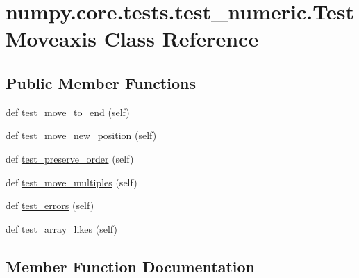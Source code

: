 \hypertarget{classnumpy_1_1core_1_1tests_1_1test__numeric_1_1TestMoveaxis}{}\section{numpy.\+core.\+tests.\+test\+\_\+numeric.\+Test\+Moveaxis Class Reference}
\label{classnumpy_1_1core_1_1tests_1_1test__numeric_1_1TestMoveaxis}
\subsection*{Public Member Functions}
\begin{DoxyCompactItemize}
\item 
def \hyperlink{classnumpy_1_1core_1_1tests_1_1test__numeric_1_1TestMoveaxis_a526c333196baffa4efd9539b0d2e0b01}{test\+\_\+move\+\_\+to\+\_\+end} (self)
\item 
def \hyperlink{classnumpy_1_1core_1_1tests_1_1test__numeric_1_1TestMoveaxis_aeb56fa047a7b46254975a127d343b294}{test\+\_\+move\+\_\+new\+\_\+position} (self)
\item 
def \hyperlink{classnumpy_1_1core_1_1tests_1_1test__numeric_1_1TestMoveaxis_ada320ecc6b9b4a7f24f2d431146dc5da}{test\+\_\+preserve\+\_\+order} (self)
\item 
def \hyperlink{classnumpy_1_1core_1_1tests_1_1test__numeric_1_1TestMoveaxis_a112dd2244fec9d72d9441cbd34c8b4d5}{test\+\_\+move\+\_\+multiples} (self)
\item 
def \hyperlink{classnumpy_1_1core_1_1tests_1_1test__numeric_1_1TestMoveaxis_abc9c60458aa647367871478ba60f1930}{test\+\_\+errors} (self)
\item 
def \hyperlink{classnumpy_1_1core_1_1tests_1_1test__numeric_1_1TestMoveaxis_ae88957b91a374a5c6f3bfb661ade7bde}{test\+\_\+array\+\_\+likes} (self)
\end{DoxyCompactItemize}


\subsection{Member Function Documentation}
\mbox{\label{classnumpy_1_1core_1_1tests_1_1test__numeric_1_1TestMoveaxis_ae88957b91a374a5c6f3bfb661ade7bde}} 

